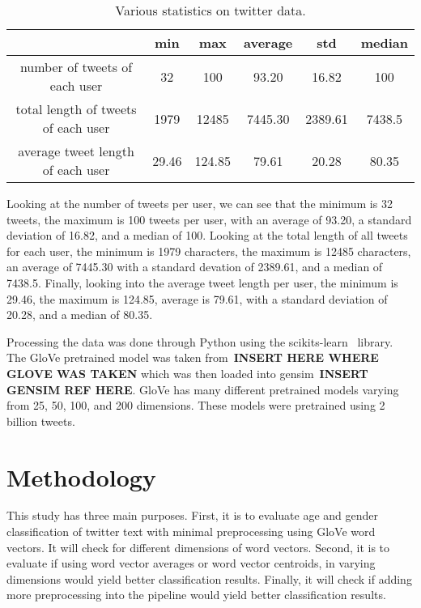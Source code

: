 \documentclass[a4paper]{llncs}
\begin{document}
\begin{table}[!htbp]
\centering
\begin{tabular}{|c|c|c|c|c|c|}
\hline
                                    & min   & max    & average & std     & median \\ \hline
number of tweets of each user       & 32    & 100    & 93.20   & 16.82   & 100    \\ \hline
total length of tweets of each user & 1979  & 12485  & 7445.30 & 2389.61 & 7438.5 \\ \hline
average tweet length of each user   & 29.46 & 124.85 & 79.61   & 20.28   & 80.35  \\ \hline
\end{tabular}
\caption{Various statistics on twitter data.}
\label{table:TweetStats}
\end{table}

Looking at the number of tweets per user, we can see that the minimum is 32 tweets, the maximum is 100 tweets per user, with an average of 93.20, a standard deviation of 16.82, and a median of 100. Looking at the total length of  all tweets for each user, the minimum is 1979 characters, the maximum is 12485 characters, an average of 7445.30 with a standard devation of 2389.61, and a median of 7438.5. Finally, looking into the average tweet length per user, the minimum is 29.46, the maximum is 124.85, average is 79.61, with a standard deviation of 20.28, and a median of 80.35.   




Processing the data was done through Python using the scikits-learn~\cite{scikit-learn} library. The GloVe pretrained model was taken from~\textbf{INSERT HERE WHERE GLOVE WAS TAKEN} which was then loaded into gensim~\textbf{INSERT GENSIM REF HERE}. GloVe has many different pretrained models varying from 25, 50, 100, and 200 dimensions. These models were pretrained using 2 billion tweets. 

\section{Methodology}
This study has three main purposes. First, it is to evaluate age and gender classification of twitter text with minimal preprocessing using GloVe word vectors. It will check for different dimensions of word vectors. Second, it is to evaluate if using word vector averages or word vector centroids, in varying dimensions would yield better classification results. Finally, it will check if adding more preprocessing into the pipeline would yield better classification results. 
\end{document}
